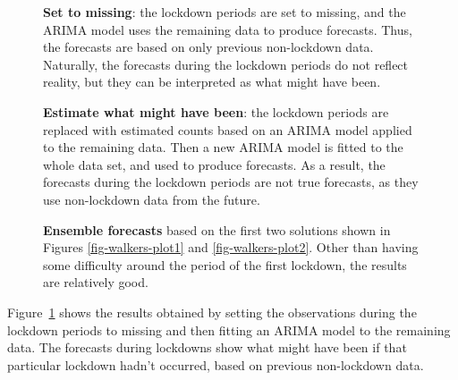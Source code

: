 \documentclass[
  11pt,
  a4paper,
]{article}
\begin{document}
\begin{figure}


\caption{\label{fig-walkers-plot3}\textbf{Set to missing}: the lockdown
periods are set to missing, and the ARIMA model uses the remaining data
to produce forecasts. Thus, the forecasts are based on only previous
non-lockdown data. Naturally, the forecasts during the lockdown periods
do not reflect reality, but they can be interpreted as what might have
been.}

\end{figure}%

\begin{figure}


\caption{\label{fig-walkers-plot4}\textbf{Estimate what might have
been}: the lockdown periods are replaced with estimated counts based on
an ARIMA model applied to the remaining data. Then a new ARIMA model is
fitted to the whole data set, and used to produce forecasts. As a
result, the forecasts during the lockdown periods are not true
forecasts, as they use non-lockdown data from the future.}

\end{figure}%

\begin{figure}


\caption{\label{fig-walkers-ensemble-plot}\textbf{Ensemble forecasts}
based on the first two solutions shown in Figures
\ref{fig-walkers-plot1} and \ref{fig-walkers-plot2}. Other than having
some difficulty around the period of the first lockdown, the results are
relatively good.}

\end{figure}%

Figure~\ref{fig-walkers-plot3} shows the results obtained by setting the
observations during the lockdown periods to missing and then fitting an
ARIMA model to the remaining data. The forecasts during lockdowns show
what might have been if that particular lockdown hadn't occurred, based
on previous non-lockdown data.
\end{document}
